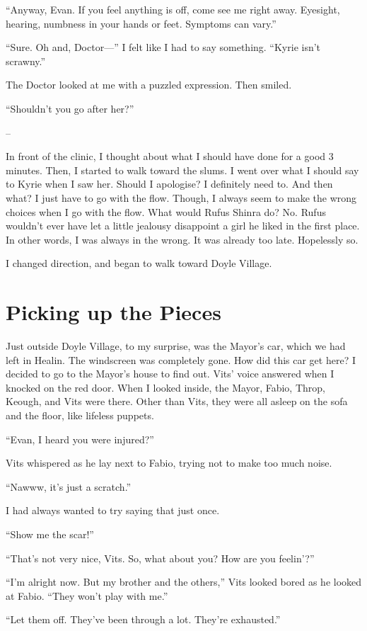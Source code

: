 \documentclass[oneside]{book}
\begin{document}
“Anyway, Evan. If you feel anything is off, come see me right away. Eyesight, hearing, numbness in your hands or feet. Symptoms can vary.”

“Sure. Oh and, Doctor—” I felt like I had to say something. “Kyrie isn’t scrawny.”

The Doctor looked at me with a puzzled expression. Then smiled.

“Shouldn’t you go after her?”

–

In front of the clinic, I thought about what I should have done for a good 3 minutes. Then, I started to walk toward the slums. I went over what I should say to Kyrie when I saw her. Should I apologise? I definitely need to. And then what? I just have to go with the flow. Though, I always seem to make the wrong choices when I go with the flow. What would Rufus Shinra do? No. Rufus wouldn’t ever have let a little jealousy disappoint a girl he liked in the first place. In other words, I was always in the wrong. It was already too late. Hopelessly so.

I changed direction, and began to walk toward Doyle Village.

\chapter{Picking up the Pieces}
Just outside Doyle Village, to my surprise, was the Mayor’s car, which we had left in Healin. The windscreen was completely gone. How did this car get here? I decided to go to the Mayor’s house to find out. Vits’ voice answered when I knocked on the red door. When I looked inside, the Mayor, Fabio, Throp, Keough, and Vits were there. Other than Vits, they were all asleep on the sofa and the floor, like lifeless puppets.

“Evan, I heard you were injured?”

Vits whispered as he lay next to Fabio, trying not to make too much noise.

“Nawww, it’s just a scratch.”

I had always wanted to try saying that just once.

“Show me the scar!”

“That’s not very nice, Vits. So, what about you? How are you feelin’?”

“I’m alright now. But my brother and the others,” Vits looked bored as he looked at Fabio. “They won’t play with me.”

“Let them off. They’ve been through a lot. They’re exhausted.”
\end{document}
